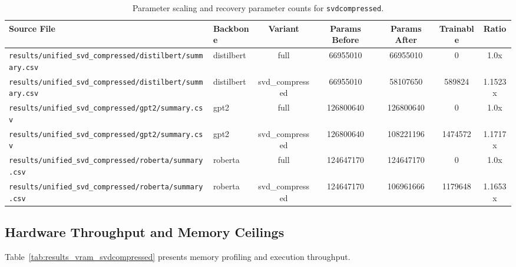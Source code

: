 \begin{table}[t]
\centering
\small
\begin{tabular}{llccccc}
\toprule
\textbf{Source File} & \textbf{Backbone} & \textbf{Variant} & \textbf{Params Before} & \textbf{Params After} & \textbf{Trainable} & \textbf{Ratio} \\
\midrule
\texttt{results/unified\_svd\_compressed/distilbert/summary.csv} & distilbert & full & 66955010 & 66955010 & 0 & 1.0x \\
\texttt{results/unified\_svd\_compressed/distilbert/summary.csv} & distilbert & svd\_compressed & 66955010 & 58107650 & 589824 & 1.1523x \\
\texttt{results/unified\_svd\_compressed/gpt2/summary.csv} & gpt2 & full & 126800640 & 126800640 & 0 & 1.0x \\
\texttt{results/unified\_svd\_compressed/gpt2/summary.csv} & gpt2 & svd\_compressed & 126800640 & 108221196 & 1474572 & 1.1717x \\
\texttt{results/unified\_svd\_compressed/roberta/summary.csv} & roberta & full & 124647170 & 124647170 & 0 & 1.0x \\
\texttt{results/unified\_svd\_compressed/roberta/summary.csv} & roberta & svd\_compressed & 124647170 & 106961666 & 1179648 & 1.1653x \\
\bottomrule
\end{tabular}
\caption{Parameter scaling and recovery parameter counts for \texttt{svdcompressed}.}
\label{tab:results_params_svdcompressed}
\end{table}

\subsection{Hardware Throughput and Memory Ceilings}
Table~\ref{tab:results_vram_svdcompressed} presents memory profiling and execution throughput.

